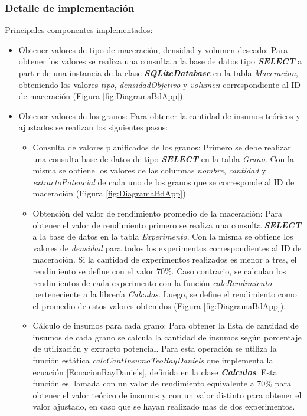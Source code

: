             \subsubsection{Detalle de implementación}
            \par Principales componentes implementados:
            \begin{itemize}
                \item Obtener valores de tipo de maceración, densidad y volumen deseado: Para obtener los valores se realiza una consulta a la base de datos tipo \textbf{ \textit{\gls{SELECT}}} a partir de una instancia de la clase \textbf{\textit{\gls{SQLiteDatabase}}} en la tabla \textit{Maceracion}, obteniendo los valores \textit{tipo}, \textit{densidadObjetivo} y \textit{volumen} correspondiente al ID de maceración (Figura \ref{fig:DiagramaBdApp}). 
                
                \item Obtener valores de los granos: 
                    Para obtener la cantidad de insumos teóricos y ajustados se realizan los siguientes pasos:
                    \begin{itemize}
                        \item Consulta de valores planificados de los granos: Primero se debe realizar una consulta base de datos de tipo \textbf{\textit{\gls{SELECT}}} en la tabla \textit{Grano}. Con la misma se obtiene los valores de las columnas \textit{nombre}, \textit{cantidad} y \textit{extractoPotencial} de cada uno de los granos que se corresponde al ID de maceración (Figura \ref{fig:DiagramaBdApp}).
                        
                        \item Obtención del valor de rendimiento promedio de la maceración: Para obtener el valor de rendimiento primero se realiza una consulta \textbf{\textit{\gls{SELECT}}} a la base de datos en la tabla \textit{Experimento}. Con la misma se obtiene los valores de \textit{densidad} para todos los experimentos correspondientes al ID de maceración. Si la cantidad de experimentos realizados es menor a tres, el rendimiento se define con el valor 70\%. Caso contrario, se calculan los rendimientos de cada experimento con la función \textit{calcRendimiento} perteneciente a la librería \textit{Calculos}. Luego, se define el rendimiento como el promedio de estos valores obtenidos (Figura \ref{fig:DiagramaBdApp}).
                        
                        \item Cálculo de insumos para cada grano: Para obtener la lista de cantidad de insumos de cada grano se calcula la cantidad de insumos según porcentaje de utilización y extracto potencial. Para esta operación se utiliza la función estática \textit{calcCantInsumoTeoRayDaniels} que implementa la ecuación \ref{EcuacionRayDaniels}, definida en la clase \textbf{\textit{Calculos}}. Esta función es llamada con un valor de rendimiento equivalente a 70\% para obtener el valor teórico de insumos y con un valor distinto para obtener el valor ajustado, en caso que se hayan realizado mas de dos experimentos.
                        

\end{itemize}
\end{itemize}
